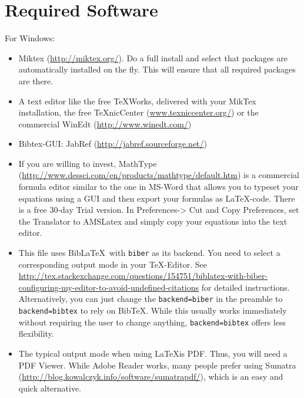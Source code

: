 \documentclass[a4paper,12pt]{scrartcl} %
\begin{document}
\clearpage                %




\tableofcontents
\clearpage
\listoffigures
\clearpage
\listoftables
\clearpage
\printglossary[type=\acronymtype,style=long,title=List of Abbreviations]
\clearpage
\printglossary[type=symbolslist,style=long,title=List of Symbols]
\clearpage


\setcounter{page}{1}        %

\section{Required Software}

For Windows:
\begin{itemize} %
   \item Miktex (\url{http://miktex.org/}). Do a full install and select that packages are automatically installed on the fly. This will ensure that all required packages are there.
   \item A text editor like the free TeXWorks, delivered with your MikTex installation, the free TeXnicCenter (\url{www.texniccenter.org/}) or the commercial WinEdt (\url{http://www.winedt.com/})
   \item Bibtex-GUI: JabRef (\url{http://jabref.sourceforge.net/})
   \item If you are willing to invest, MathType (\url{http://www.dessci.com/en/products/mathtype/default.htm}) is a commercial formula editor similar to the one in MS-Word that allows you to typeset your equations using a GUI and then export your formulas as \LaTeX-code. There is a free 30-day Trial version. In Preferences-> Cut and Copy Preferences, set the Translator to AMSLatex and simply copy your equations into the text editor.
   \item This file uses Bib\LaTeX\ with \texttt{biber} as its backend. You need to select a corresponding output mode in your \TeX-Editor. See \url{http://tex.stackexchange.com/questions/154751/biblatex-with-biber-configuring-my-editor-to-avoid-undefined-citations} for detailed instructions. Alternatively, you can just change the \texttt{backend=biber} in the preamble to \texttt{backend=bibtex} to rely on Bib\TeX. While this usually works immediately without requiring the user to change anything, \texttt{backend=bibtex} offers less flexibility.
   \item The typical output mode when using \LaTeX is PDF. Thus, you will need a PDF Viewer. While Adobe Reader works, many people prefer using Sumatra (\url{http://blog.kowalczyk.info/software/sumatrapdf/}), which is an easy and quick alternative.
\end{itemize}
\end{document}
